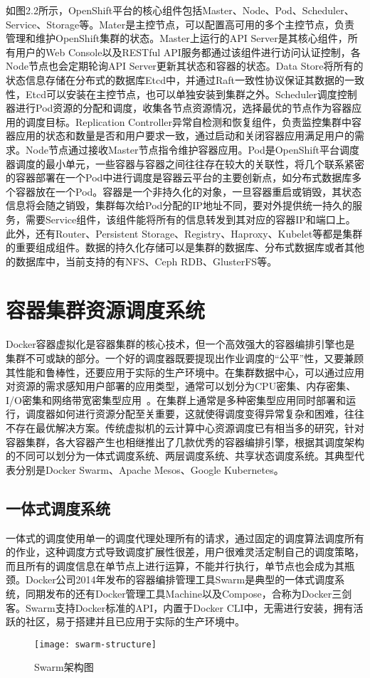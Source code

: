 如图2.2所示，OpenShift平台的核心组件包括Master、Node、Pod、Scheduler、Service、Storage等。Mater是主控节点，可以配置高可用的多个主控节点，负责管理和维护OpenShift集群的状态。Master上运行的API Server是其核心组件，所有用户的Web Console以及RESTful API服务都通过该组件进行访问认证控制，各Node节点也会定期轮询API Server更新其状态和容器的状态。Data Store将所有的状态信息存储在分布式的数据库Etcd中，并通过Raft一致性协议保证其数据的一致性，Etcd可以安装在主控节点，也可以单独安装到集群之外。Scheduler调度控制器进行Pod资源的分配和调度，收集各节点资源情况，选择最优的节点作为容器应用的调度目标。Replication Controller异常自检测和恢复组件，负责监控集群中容器应用的状态和数量是否和用户要求一致，通过启动和关闭容器应用满足用户的需求。Node节点通过接收Master节点指令维护容器应用。Pod是OpenShift平台调度器调度的最小单元，一些容器与容器之间往往存在较大的关联性，将几个联系紧密的容器部署在一个Pod中进行调度是容器云平台的主要创新点，如分布式数据库多个容器放在一个Pod。容器是一个非持久化的对象，一旦容器重启或销毁，其状态信息将会随之销毁，集群每次给Pod分配的IP地址不同，要对外提供统一持久的服务，需要Service组件，该组件能将所有的信息转发到其对应的容器IP和端口上。此外，还有Router、Persistent Storage、Registry、Haproxy、Kubelet等都是集群的重要组成组件。数据的持久化存储可以是集群的数据库、分布式数据库或者其他的数据库中，当前支持的有NFS、Ceph RDB、GlusterFS等。

\section{容器集群资源调度系统}
\label{sec:scheduler}
Docker容器虚拟化是容器集群的核心技术，但一个高效强大的容器编排引擎也是集群不可或缺的部分。一个好的调度器既要提现出作业调度的“公平”性，又要兼顾其性能和鲁棒性，还要应用于实际的生产环境中。在集群数据中心，可以通过应用对资源的需求感知用户部署的应用类型，通常可以划分为CPU密集、内存密集、I/O密集和网络带宽密集型应用~\cite{Peng2016Research,Shuangke2017SchedulingStrategy}。在集群上通常是多种密集型应用同时部署和运行，调度器如何进行资源分配至关重要，这就使得调度变得异常复杂和困难，往往不存在最优解决方案。传统虚拟机的云计算中心资源调度已有相当多的研究，针对容器集群，各大容器产生也相继推出了几款优秀的容器编排引擎，根据其调度架构的不同可以划分为一体式调度系统、两层调度系统、共享状态调度系统。其典型代表分别是Docker Swarm、Apache Mesos、Google Kubernetes。

\subsection{一体式调度系统}
一体式的调度使用单一的调度代理处理所有的请求，通过固定的调度算法调度所有的作业，这种调度方式导致调度扩展性很差，用户很难灵活定制自己的调度策略，而且所有的调度信息在单节点上进行运算，不能并行执行，单节点也会成为其瓶颈。Docker公司2014年发布的容器编排管理工具Swarm是典型的一体式调度系统，同期发布的还有Docker管理工具Machine以及Compose，合称为Docker三剑客。Swarm支持Docker标准的API，内置于Docker CLI中，无需进行安装，拥有活跃的社区，易于搭建并且已应用于实际的生产环境中。
\begin{figure}[H] %
	\centering
	\texttt{[image: swarm-structure]}
	\caption{Swarm架构图}
\end{figure}

